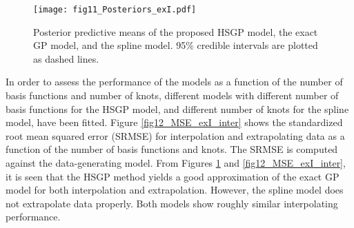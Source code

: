 \begin{figure}
\centering
\texttt{[image: fig11\_Posteriors\_exI.pdf]}
\caption{Posterior predictive means of the proposed HSGP model, the exact GP model, and the spline model. 95\% credible intervals are plotted as dashed lines.}
  \label{fig11_Posteriors_exI}
\end{figure}

In order to assess the performance of the models as a function of the number of basis functions and number of knots, different models with different number of basis functions for the HSGP model, and different number of knots for the spline model, have been fitted. Figure \ref{fig12_MSE_exI_inter} shows the standardized root mean squared error (SRMSE) for interpolation and extrapolating data as a function of the number of basis functions and knots. The SRMSE is computed against the data-generating model. From Figures \ref{fig11_Posteriors_exI} and \ref{fig12_MSE_exI_inter}, it is seen that the HSGP method yields a good approximation of the exact GP model for both interpolation and extrapolation. However, the spline model does not extrapolate data properly. Both models show roughly similar interpolating performance.  


